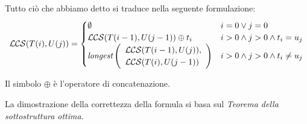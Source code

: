 \bigskip\noindent Tutto ciò che abbiamo detto si traduce nella seguente
formulazione:
\[\mathcal{LCS}(T(i),U(j))=\begin{cases}
    \emptyset & i=0 \vee j=0\\
    \mathcal{LCS}(T(i-1),U(j-1))\oplus t_i & i>0 \wedge j>0 \wedge t_i=u_j\\
    \emph{longest}\left(\begin{array}{l}
        \mathcal{LCS}(T(i-1),U(j)),\\
        \mathcal{LCS}(T(i),U(j-1))
    \end{array}\right) &
    i>0 \wedge j>0 \wedge t_i\neq u_j
\end{cases}\]
\begin{note}
    Il simbolo $\oplus$ è l'operatore di concatenazione.
\end{note}\noindent
La dimostrazione della correttezza della formula si basa sul \emph{Teorema
della sottostruttura ottima}.


